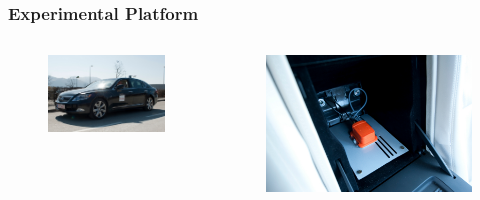 \documentclass{beamer}
\begin{document}
	\begin{frame}
		\frametitle{Experimental Platform}
		\begin{columns}[t]
		  \begin{column}{5cm}
		  \begin{figure}[h]
			\centering
			\includegraphics[scale=0.25]{../img/testbed:car}

		  \end{figure}	
		  \end{column}
		  
		  \begin{column}{5cm}
		  \begin{figure}[h]
			\center
			\includegraphics[scale=0.7]{../img/testbed:xsens}
		  \end{figure}   
		  \end{column}
		 \end{columns}			
		

\end{frame}
\end{document}
